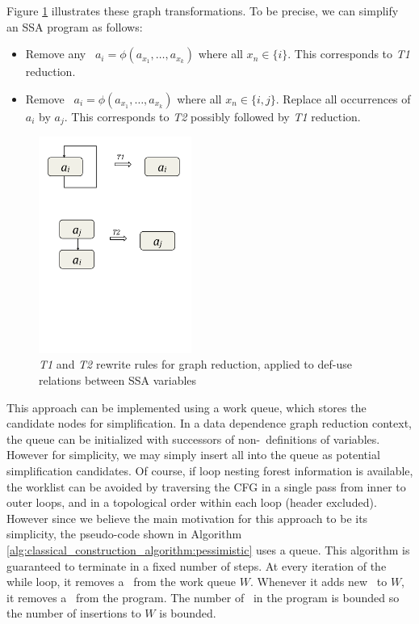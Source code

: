 Figure \ref{fig:t1t2transforms} illustrates these graph transformations.
To be precise, we can simplify an SSA program as follows:
\begin{itemize}
\item Remove any \phiop\ $a_i=\phi(a_{x_1},\ldots,a_{x_k})$ where all $x_n
  \in \{ i \}$. This corresponds to \emph{T1} reduction.
\item Remove \phiop\ $a_i=\phi(a_{x_1},\ldots,a_{x_k})$ where all
 $x_n \in \{ i, j \}$. Replace all occurrences of $a_i$ by $a_j$.
 This corresponds to \emph{T2} possibly followed by
 \emph{T1} reduction.
\end{itemize}

\begin{figure}
\includegraphics[width=5cm,trim=1cm 8cm 1cm 0cm]{t1_t2_transforms.pdf}
\caption{\label{fig:t1t2transforms}\emph{T1} and \emph{T2} rewrite
  rules for graph reduction, applied to def-use relations between SSA variables}
\end{figure}

This approach can be implemented using a work queue, 
which stores the candidate nodes for simplification.
In a data dependence graph reduction context, 
the queue can be initialized with
successors of non-\phiop\ definitions of variables.
However for simplicity, we may simply insert all \phiops into the
queue
as potential simplification candidates.
Of course, if loop nesting forest
information is available, 
the worklist can be avoided by traversing the CFG in a single pass 
from inner to outer loops, and in a topological order within each loop (header excluded).
However since we believe the main motivation for this approach to be its
simplicity,
the pseudo-code shown in Algorithm 
\ref{alg:classical_construction_algorithm:pessimistic} uses a queue.
This algorithm is guaranteed to terminate in a fixed number of steps.
At every iteration of the while loop, it removes a \phiop\ from the
work queue
$W$. Whenever it adds new \phiops\ to $W$, it removes a \phiop\ from
the program.
The number of \phiops\ in 
the program is bounded so the number of insertions to $W$ is bounded.

